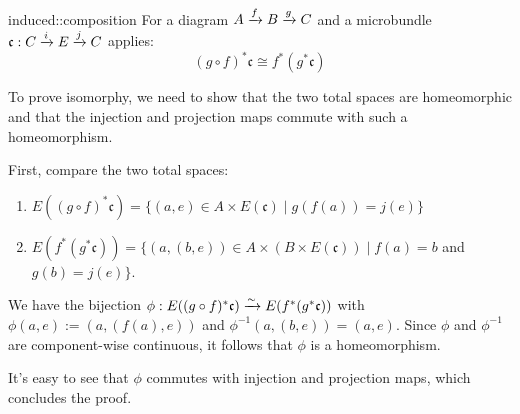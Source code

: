 \begin{mylemma}{induced::composition}
    For a diagram $A \xto{f} B \xto{g} C$ and a microbundle $\mathfrak{c}: \bundle{C}{E}{i}{j}$ applies:
    \[ (g \circ f)^*\mathfrak{c} \cong f^*(g^*\mathfrak{c}) \]
\end{mylemma}
\begin{myproof}
    To prove isomorphy, we need to show that the two total spaces are homeomorphic and that the injection and projection maps commute with
    such a homeomorphism.
    
    First, compare the two total spaces:
    \begin{enumerate}
        \item $E((g \circ f)^*\mathfrak{c}) = \{ (a, e) \in A \times E(\mathfrak{c}) \mid g(f(a)) = j(e)\}$ 
        \item $E(f^*(g^*\mathfrak{c})) = \{ (a, (b, e)) \in A \times (B \times E(\mathfrak{c})) \mid f(a) = b$ and $ g(b) = j(e) \}$.
    \end{enumerate}
    We have the bijection $\phi: E((g \circ f)^*\mathfrak{c}) \isomto E(f^*(g^*\mathfrak{c}))$ with $\phi(a, e) := (a, (f(a), e))$ and $\phi^{-1}(a, (b, e)) = (a, e)$.
    Since $\phi$ and $\phi^{-1}$ are component-wise continuous, it follows that $\phi$ is a homeomorphism.
    
    It's easy to see that $\phi$ commutes with injection and projection maps, which concludes the proof.
\end{myproof}
